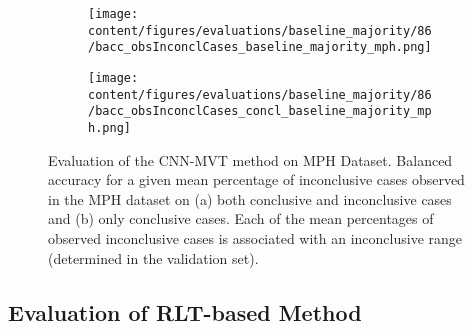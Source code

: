 \begin{figure}[t]
\begin{subfigure}{0.9\textwidth}
  \centering
  \texttt{[image: content/figures/evaluations/baseline\_majority/86/bacc\_obsInconclCases\_baseline\_majority\_mph.png]}
  \subcaption{}
  \label{fig:bacc_obsInconclCases_baseline_majority_mph}
\end{subfigure}
\hfill
\begin{subfigure}{0.9\textwidth}
  \centering
  \texttt{[image: content/figures/evaluations/baseline\_majority/86/bacc\_obsInconclCases\_concl\_baseline\_majority\_mph.png]}
  \subcaption{}
  \label{fig:bacc_obsInconclCases_concl_baseline_majority_mph}
\end{subfigure}

\caption{Evaluation of the CNN-MVT method on MPH Dataset.
Balanced accuracy for a given mean percentage of inconclusive cases observed in the MPH dataset on 
(a) both conclusive and inconclusive cases and (b) only conclusive cases. 
Each of the mean percentages of observed inconclusive cases is associated 
with an inconclusive range (determined in the validation set). }
\label{fig:bacc_obsInconclCases_baseline_majority_mph_full}
\end{figure}


\subsection{Evaluation of RLT-based Method}
\label{subsec:eval_rlt}





